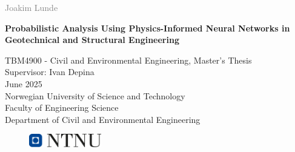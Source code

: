 \documentclass[a4paper, 12pt,twoside,fleqn]{book}
\begin{document}

\begin{titlepage}
  \vspace*{1.5cm}

  \noindent  \textcolor{gray}{\large Joakim Lunde} \\
  \vspace{1cm}

  \noindent \textbf{\LARGE Probabilistic Analysis Using Physics-Informed Neural Networks in Geotechnical and Structural Engineering\\}

  \vfill  %

  \noindent TBM4900 - Civil and Environmental Engineering, Master's Thesis \\
  Supervisor: Ivan Depina \\
  June 2025 \\

  \vspace{0.8cm}
  \noindent
  Norwegian University of Science and Technology \\
  Faculty of Engineering Science \\
  Department of Civil and Environmental Engineering \\
  \vspace{0.8cm}

  \begin{figure}[h]
    \includegraphics[width=0.28\textwidth]{Figures/ntnu_basic.png}
  \end{figure}
\end{titlepage}





\tableofcontents
{}

\listoffigures
{}

\listoftables
{}

\printglossary[title=Glossary, toctitle=Glossary]


\cleardoublepage
{}
 










\chapter*{\bibname}
\printbibliography[heading=none]
\cleardoublepage

% 
\end{document}
